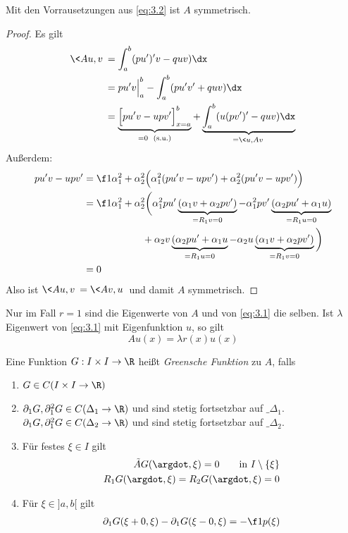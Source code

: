 \setcounter{thm}{8}
\begin{st} \label{3.9}
	Mit den Vorrausetzungen aus \eqref{eq:3.2} ist $A$ symmetrisch.
	\begin{proof}
		Es gilt
		\begin{align*}
			\<Au,v\> 
			&= \int_a^b (pu')'v - quv) \dx \\
			&= pu'v \Big|_a^b - \int_a^b (pu'v' + quv) \dx \\
			&= \underbrace{\Big[ pu'v - upv' \Big]_{x=a}^b}_{\text{=0 \text{ (s.u.)}}} + \underbrace{\int_a^b (u(pv')' - quv) \dx}_{= \<u,Av\>} \\
		\end{align*}
		Außerdem:
		\begin{align*}
			pu'v - upv' 
			&= \f 1{\alpha_1^2 + \alpha_2^2} \Big( \alpha_1^2 (pu'v - upv') + \alpha_2^2 (pu'v-upv') \Big) \\
			&= \f 1{\alpha_1^2 + \alpha_2^2} \bigg( \alpha_1^2 pu'\underbrace{(\alpha_1 v + \alpha_2 pv')}_{=R_1v = 0} - \alpha_1^2 pv'\underbrace{(\alpha_2pu'+ \alpha_1 u)}_{= R_1u = 0} \\
			 & \qquad\qquad\qquad + \alpha_2 v\underbrace{(\alpha_2 p u' + \alpha_1 u}_{=R_1 u = 0}  - \alpha_2 u \underbrace{(\alpha_1 v + \alpha_2 pv')}_{= R_1v= 0} \bigg)  \\
			 &= 0
		\end{align*}
		Also ist $\<Au,v\> = \<Av,u\>$ und damit $A$ symmetrisch.
	\end{proof}
\end{st}

\begin{nt} \label{3.10}
	Nur im Fall $r= 1$ sind die Eigenwerte von $A$ und von \eqref{eq:3.1} die selben.
	Ist $\lambda$ Eigenwert von \eqref{eq:3.1} mit Eigenfunktion $u$, so gilt
	\[
		A u(x) = \lambda r(x) u(x)
	\]
\end{nt}

\begin{df} \label{3.11}
	Eine Funktion $G: I \times I \to \R$ heißt \emph{Greensche Funktion} zu $A$, falls
	\begin{enumerate}[1)]
		\item
			$G \in C(I\times I \to \R)$
		\item

			$\partial_1 G, \partial_1^2 G \in C(\Delta_1 \to \R)$ und sind stetig fortsetzbar auf $\_{\Delta_1}$.
			$\partial_1 G, \partial_1^2 G \in C(\Delta_2 \to \R)$ und sind stetig fortsetzbar auf $\_{\Delta_2}$.
		\item
			Für festes $\xi \in I$ gilt
			\begin{align*}
				\tilde A G(\argdot, \xi) = 0 \qquad \text{in $I \setminus \{\xi\}$} \\
				R_1 G(\argdot, \xi) = R_2 G(\argdot, \xi) = 0 
			\end{align*}
		\item
			Für $\xi \in ]a,b[$ gilt
			\begin{align*}
				\partial_1 G (\xi + 0, \xi) - \partial_1 G(\xi - 0, \xi) = -\f 1{p(\xi)}
			\end{align*}
	\end{enumerate}
\end{df}

